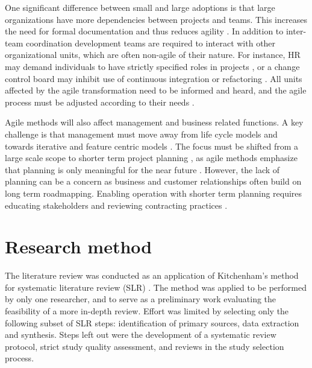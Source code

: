 \documentclass[lnbip]{svmultln}
\begin{document}
One significant difference between small and large adoptions is that large
organizations have more dependencies between projects and teams. This increases
the need for formal documentation and thus reduces agility .
In addition to inter-team coordination development teams are required to
interact with other organizational units, which are often non-agile of their
nature. For instance, HR may demand individuals to have strictly specified roles
in projects , or a change control board may inhibit use of
continuous integration or refactoring . All units affected
by the agile transformation need to be informed and heard, and the agile process
must be adjusted according to their needs .

Agile methods will also affect management and business related functions. A key
challenge is that management must move away from life cycle models and towards
iterative and feature centric models . The focus must be
shifted from a large scale scope to shorter term project planning
, as agile methods emphasize that planning is only meaningful
for the near future . However, the lack of planning can be a
concern as business and customer relationships often build on long term
roadmapping. Enabling operation with shorter term planning requires educating
stakeholders and reviewing contracting practices .


\section{Research method}
\label{sec:method}

%
%
%


The literature review was conducted as an application of Kitchenham's
method for systematic literature review (SLR) . The method
was applied to be performed by only one researcher, and to serve as a
preliminary work evaluating the feasibility of a more in-depth review.
Effort was limited by selecting only the following subset of SLR steps:
identification of primary sources, data extraction and synthesis. Steps left out
were the development of a systematic review protocol, strict study quality
assessment, and reviews in the study selection process.
\end{document}
